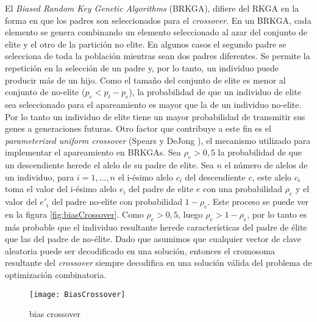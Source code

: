 El \textit{Biased Random Key Genetic Algorithms} (BRKGA), difiere del RKGA en la forma en que los padres son seleccionados para el \textit{crossover}. En un BRKGA, cada elemento se genera combinando un elemento seleccionado al azar del conjunto de elite y el otro de la partición no elite. En algunos casos el segundo padre se selecciona de toda la población mientras sean dos padres diferentes. Se permite la repetición en la selección de un padre y, por lo tanto, un individuo puede producir más de un hijo. Como el tamaño del conjunto de elite es menor al conjunto de no-elite ($p_e < p_t - p_e$), la probabilidad de que un individuo de elite sea seleccionado para el apareamiento es mayor que la de un individuo no-elite. Por lo tanto un individuo de elite tiene un mayor probabilidad de transmitir sus genes a generaciones futuras. Otro factor que contribuye a este fin es el \textit{parameterized uniform crossover} (Spears y DeJong \cite{SpearsDeJong}), el mecanismo utilizado para implementar el apareamiento en BRKGAs. Sea $\rho_e > 0,5$ la probabilidad de que un descendiente herede el alelo de su padre de elite. Sea $n$ el número de alelos de un individuo, para $i =1,...,n$ el i-ésimo alelo $c_i$ del descendiente $c$, este alelo $c_i$ toma el valor del i-ésimo alelo $e_i$ del padre de elite $e$ con una probabilidad $\rho_e$ y el valor del $e'_i$ del padre no-elite con probabilidad $1-\rho_e$. Este proceso se puede ver en la figura \ref{fig:biasCrossover}. Como $\rho_e > 0,5$, luego $\rho_e > 1 - \rho_e$, por lo tanto es más probable que el individuo resultante herede características del padre de élite que las del padre de no-élite. Dado que asumimos que cualquier vector de clave aleatoria puede ser decodificado en una solución, entonces el cromosoma resultante del \textit{crossover} siempre decodifica en una solución válida del problema de optimización combinatoria.



\begin{figure}[h]
	\caption{bias crossover}
	\centering
	\texttt{[image: BiasCrossover]}
	\label{fig:biascrossover}
\end{figure}

